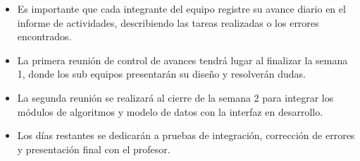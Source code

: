 \vspace{0.5cm}

\begin{itemize}
  \item Es importante que cada integrante del equipo registre su avance diario en el informe
        de actividades, describiendo las tareas realizadas o los errores encontrados.
  \item La primera reunión de control de avances tendrá lugar al finalizar la semana 1, donde
        los sub equipos presentarán su diseño y resolverán dudas.
  \item La segunda reunión se realizará al cierre de la semana 2 para integrar los módulos de
        algoritmos y modelo de datos con la interfaz en desarrollo.
  \item Los días restantes se dedicarán a pruebas de integración, corrección de errores y
        presentación final con el profesor.
\end{itemize}
